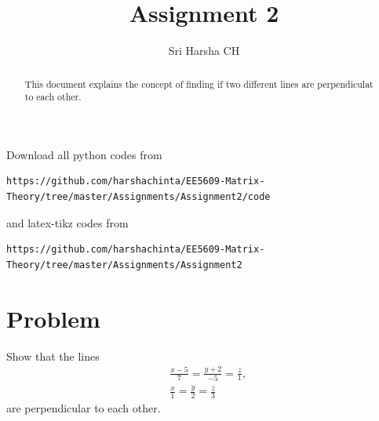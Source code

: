 \documentclass[journal,12pt,twocolumn]{IEEEtran}
\begin{document}
\renewcommand{\thefigure}{\theproblem}

\def\putbox#1#2#3{\makebox[0in][l]{\makebox[#1][l]{}\raisebox{\baselineskip}[0in][0in]{\raisebox{#2}[0in][0in]{#3}}}}
     \def\rightbox#1{\makebox[0in][r]{#1}}
     \def\centbox#1{\makebox[0in]{#1}}
     \def\topbox#1{\raisebox{-\baselineskip}[0in][0in]{#1}}
     \def\midbox#1{\raisebox{-0.5\baselineskip}[0in][0in]{#1}}
\vspace{3cm}
\title{Assignment 2}
\author{Sri Harsha CH}

\maketitle
\newpage

\bigskip
\renewcommand{\thefigure}{\theenumi}
\renewcommand{\thetable}{\theenumi}

\begin{abstract}
This document explains the concept of finding if two different lines are perpendiculat to each other.
\end{abstract}

Download all python codes from 
\begin{lstlisting}
https://github.com/harshachinta/EE5609-Matrix-Theory/tree/master/Assignments/Assignment2/code
\end{lstlisting}
%
and latex-tikz codes from 
%
\begin{lstlisting}
https://github.com/harshachinta/EE5609-Matrix-Theory/tree/master/Assignments/Assignment2
\end{lstlisting}
%
\section{Problem}
Show that the lines \\
 \begin{align}
& \frac{x-5}{7} = \frac{y+2}{-5} = \frac{z}{1} ,\\
& \frac{x}{1} = \frac{y}{2} = \frac{z}{3}
\end{align}
are perpendicular to each other.
\end{document}
